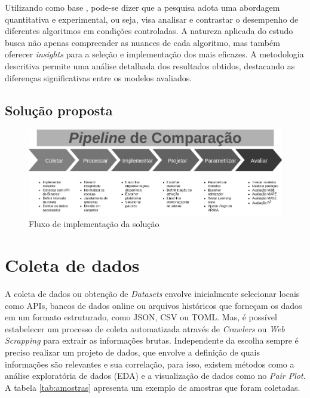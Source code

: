 
Utilizando como base \textcite{pesquisa}, pode-se dizer que a pesquisa adota
uma abordagem quantitativa e experimental, ou seja, visa analisar e contrastar o desempenho
de diferentes algoritmos em condições controladas. A natureza aplicada do estudo busca não
apenas compreender as nuances de cada algoritmo, mas também oferecer \textit{insights} para a seleção
e implementação dos mais eficazes. A metodologia descritiva permite uma análise detalhada
dos resultados obtidos, destacando as diferenças significativas entre os modelos avaliados.

\subsection{Solução proposta} \label{sec:solucao}

\begin{figure}[!htb] \centering
    \caption{Fluxo de implementação da solução} \label{figura:proposta}
    \begin{varwidth}{\linewidth}
      \includegraphics[width=16cm]{figuras/proposta.png}
    \end{varwidth}
  \end{figure}

\section{Coleta de dados} \label{sec:coleta}
A coleta de dados ou obtenção de \textit{Datasets} envolve inicialmente selecionar locais como APIs, bancos de dados online ou arquivos históricos que forneçam os dados em um formato estruturado, como JSON, CSV ou TOML.
Mas, é possível estabelecer um processo de coleta automatizada através de \textit{Crawlers} ou \textit{Web Scrapping} para extrair as informações brutas.
Independente da escolha sempre é preciso realizar um projeto de dados, que envolve a definição de quais informações são relevantes e sua correlação, para isso, existem métodos como a análise exploratória de dados (EDA) e a visualização de dados como no \textit{Pair Plot}.
A tabela \ref{tab:amostras} apresenta um exemplo de amostras que foram coletadas.

